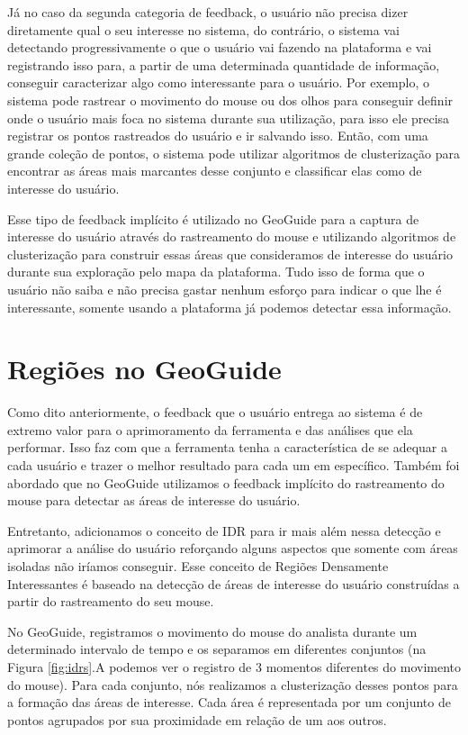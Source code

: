 Já no caso da segunda categoria de feedback, o usuário não precisa dizer diretamente qual o seu interesse no sistema, do contrário, o sistema vai detectando progressivamente o que o usuário vai fazendo na plataforma e vai registrando isso para, a partir de uma determinada quantidade de informação, conseguir caracterizar algo como interessante para o usuário. Por exemplo, o sistema pode rastrear o movimento do mouse ou dos olhos para conseguir definir onde o usuário mais foca no sistema durante sua utilização, para isso ele precisa registrar os pontos rastreados do usuário e ir salvando isso. Então, com uma grande coleção de pontos, o sistema pode utilizar algoritmos de clusterização para encontrar as áreas mais marcantes desse conjunto e classificar elas como de interesse do usuário.

Esse tipo de feedback implícito é utilizado no GeoGuide para a captura de interesse do usuário através do rastreamento do mouse e utilizando algoritmos de clusterização para construir essas áreas que consideramos de interesse do usuário durante sua exploração pelo mapa da plataforma. Tudo isso de forma que o usuário não saiba e não precisa gastar nenhum esforço para indicar o que lhe é interessante, somente usando a plataforma já podemos detectar essa informação.

\section{Regiões no GeoGuide}

Como dito anteriormente, o feedback que o usuário entrega ao sistema é de extremo valor para o aprimoramento da ferramenta e das análises que ela performar. Isso faz com que a ferramenta tenha a característica de se adequar a cada usuário e trazer o melhor resultado para cada um em específico. Também foi abordado que no GeoGuide utilizamos o feedback implícito do rastreamento do mouse para detectar as áreas de interesse do usuário.

Entretanto, adicionamos o conceito de IDR para ir mais além nessa detecção e aprimorar a análise do usuário reforçando alguns aspectos que somente com áreas isoladas não iríamos conseguir. Esse conceito de Regiões Densamente Interessantes é baseado na detecção de áreas de interesse do usuário construídas a partir do rastreamento do seu mouse.

No GeoGuide, registramos o movimento do mouse do analista durante um determinado intervalo de tempo e os separamos em diferentes conjuntos (na Figura \ref{fig:idrs}.A podemos ver o registro de 3 momentos diferentes do movimento do mouse). Para cada conjunto, nós realizamos a clusterização desses pontos para a formação das áreas de interesse. Cada área é representada por um conjunto de pontos agrupados por sua proximidade em relação de um aos outros.


